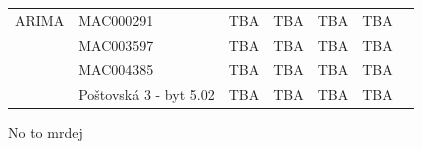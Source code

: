 \documentclass[FM,BP,fonts]{tulthesis}
\begin{document}
\begin{table}[!ht]
\begin{tabular}{lllllll}
				\hline
		
		ARIMA           & MAC000291          & TBA            & TBA             & TBA        &  TBA            \\ 
		~               & MAC003597          & TBA            & TBA             & TBA            & TBA             \\  
		~               & MAC004385          & TBA            & TBA             & TBA           & TBA             \\ 
		~               & Poštovská 3 - byt 5.02              & TBA           & TBA             & TBA           & TBA \\   
		

	\end{tabular}
\end{table}



No to mrdej
\end{document}
